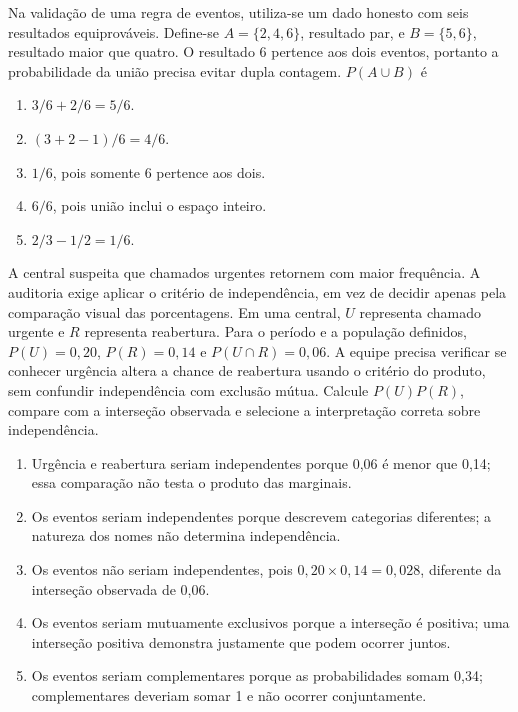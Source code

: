 \TextoBase Na validação de uma regra de eventos, utiliza-se um dado honesto com seis resultados equiprováveis. Define-se $A=\{2,4,6\}$, resultado par, e $B=\{5,6\}$, resultado maior que quatro. O resultado 6 pertence aos dois eventos, portanto a probabilidade da união precisa evitar dupla contagem.
\FonteDidatica
\Comando $P(A\cup B)$ é
\begin{enumerate}[label=\Alph*)]\item $3/6+2/6=5/6$.\item $(3+2-1)/6=4/6$.\item $1/6$, pois somente 6 pertence aos dois.\item $6/6$, pois união inclui o espaço inteiro.\item $2/3-1/2=1/6$.\end{enumerate}

\TextoBase

A central suspeita que chamados urgentes retornem com maior frequência. A auditoria exige aplicar o critério de independência, em vez de decidir apenas pela comparação visual das porcentagens.
 Em uma central, $U$ representa chamado urgente e $R$ representa reabertura. Para o período e a população definidos, $P(U)=0{,}20$, $P(R)=0{,}14$ e $P(U\cap R)=0{,}06$. A equipe precisa verificar se conhecer urgência altera a chance de reabertura usando o critério do produto, sem confundir independência com exclusão mútua.
\FonteDidatica
\Comando Calcule $P(U)P(R)$, compare com a interseção observada e selecione a interpretação correta sobre independência.

\begin{enumerate}[label=\Alph*)]
  \item Urgência e reabertura seriam independentes porque 0,06 é menor que 0,14; essa comparação não testa o produto das marginais.
  \item Os eventos seriam independentes porque descrevem categorias diferentes; a natureza dos nomes não determina independência.
  \item Os eventos não seriam independentes, pois $0{,}20\times0{,}14=0{,}028$, diferente da interseção observada de 0,06.
  \item Os eventos seriam mutuamente exclusivos porque a interseção é positiva; uma interseção positiva demonstra justamente que podem ocorrer juntos.
  \item Os eventos seriam complementares porque as probabilidades somam 0,34; complementares deveriam somar 1 e não ocorrer conjuntamente.
\end{enumerate}


